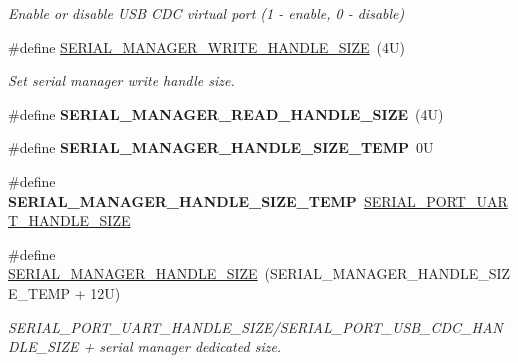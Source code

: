 \begin{DoxyCompactItemize}
\begin{DoxyCompactList}\small\item\em Enable or disable U\+SB C\+DC virtual port (1 -\/ enable, 0 -\/ disable) \end{DoxyCompactList}\item 
\mbox{\label{group__serialmanager_gac278be51c3508495c1be1a4cff566f3f}} 
\#define \mbox{\hyperlink{group__serialmanager_gac278be51c3508495c1be1a4cff566f3f}{S\+E\+R\+I\+A\+L\+\_\+\+M\+A\+N\+A\+G\+E\+R\+\_\+\+W\+R\+I\+T\+E\+\_\+\+H\+A\+N\+D\+L\+E\+\_\+\+S\+I\+ZE}}~(4\+U)
\begin{DoxyCompactList}\small\item\em Set serial manager write handle size. \end{DoxyCompactList}\item 
\mbox{\label{group__serialmanager_ga28b58196f19421f361cea370e9459e77}} 
\#define {\bfseries S\+E\+R\+I\+A\+L\+\_\+\+M\+A\+N\+A\+G\+E\+R\+\_\+\+R\+E\+A\+D\+\_\+\+H\+A\+N\+D\+L\+E\+\_\+\+S\+I\+ZE}~(4\+U)
\item 
\mbox{\label{group__serialmanager_ga6fea797be8d0d34fc8abea7b916ce48b}} 
\#define {\bfseries S\+E\+R\+I\+A\+L\+\_\+\+M\+A\+N\+A\+G\+E\+R\+\_\+\+H\+A\+N\+D\+L\+E\+\_\+\+S\+I\+Z\+E\+\_\+\+T\+E\+MP}~0U
\item 
\mbox{\label{group__serialmanager_ga6fea797be8d0d34fc8abea7b916ce48b}} 
\#define {\bfseries S\+E\+R\+I\+A\+L\+\_\+\+M\+A\+N\+A\+G\+E\+R\+\_\+\+H\+A\+N\+D\+L\+E\+\_\+\+S\+I\+Z\+E\+\_\+\+T\+E\+MP}~\mbox{\hyperlink{group__serial__port__uart_ga2109c092d5f72ef7729b0454b40e892f}{S\+E\+R\+I\+A\+L\+\_\+\+P\+O\+R\+T\+\_\+\+U\+A\+R\+T\+\_\+\+H\+A\+N\+D\+L\+E\+\_\+\+S\+I\+ZE}}
\item 
\mbox{\label{group__serialmanager_gabc4aa7ae83c31b66e437d7fd264aaebc}} 
\#define \mbox{\hyperlink{group__serialmanager_gabc4aa7ae83c31b66e437d7fd264aaebc}{S\+E\+R\+I\+A\+L\+\_\+\+M\+A\+N\+A\+G\+E\+R\+\_\+\+H\+A\+N\+D\+L\+E\+\_\+\+S\+I\+ZE}}~(S\+E\+R\+I\+A\+L\+\_\+\+M\+A\+N\+A\+G\+E\+R\+\_\+\+H\+A\+N\+D\+L\+E\+\_\+\+S\+I\+Z\+E\+\_\+\+T\+E\+MP + 12\+U)
\begin{DoxyCompactList}\small\item\em S\+E\+R\+I\+A\+L\+\_\+\+P\+O\+R\+T\+\_\+\+U\+A\+R\+T\+\_\+\+H\+A\+N\+D\+L\+E\+\_\+\+S\+I\+Z\+E/\+S\+E\+R\+I\+A\+L\+\_\+\+P\+O\+R\+T\+\_\+\+U\+S\+B\+\_\+\+C\+D\+C\+\_\+\+H\+A\+N\+D\+L\+E\+\_\+\+S\+I\+ZE + serial manager dedicated size. \end{DoxyCompactList}\item 

\end{DoxyCompactItemize}
